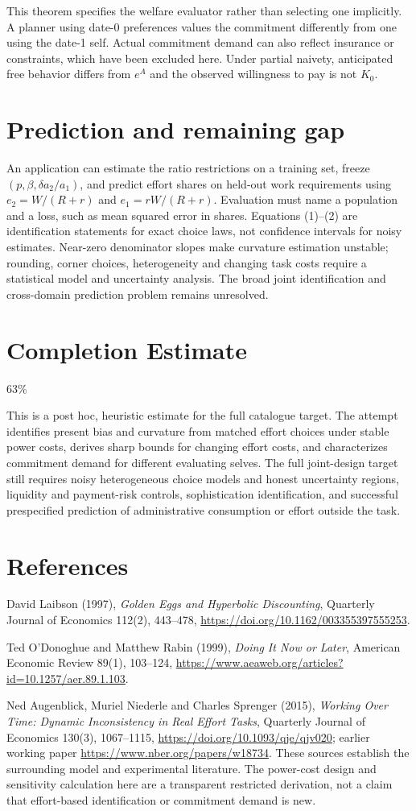 \documentclass[11pt,a4paper]{article}
\theoremstyle{definition}
\theoremstyle{remark}
\begin{document}
This theorem specifies the welfare evaluator rather than selecting one implicitly. A planner using date-0 preferences values the commitment differently from one using the date-1 self. Actual commitment demand can also reflect insurance or constraints, which have been excluded here. Under partial naivety, anticipated free behavior differs from $e^A$ and the observed willingness to pay is not $K_0$.

\section{Prediction and remaining gap}
An application can estimate the ratio restrictions on a training set, freeze $(p,\beta,\delta a_2/a_1)$, and predict effort shares on held-out work requirements using $e_2=W/(R+r)$ and $e_1=rW/(R+r)$. Evaluation must name a population and a loss, such as mean squared error in shares. Equations (1)--(2) are identification statements for exact choice laws, not confidence intervals for noisy estimates. Near-zero denominator slopes make curvature estimation unstable; rounding, corner choices, heterogeneity and changing task costs require a statistical model and uncertainty analysis. The broad joint identification and cross-domain prediction problem remains unresolved.

\section{Completion Estimate}
63\%

This is a post hoc, heuristic estimate for the full catalogue target.
The attempt identifies present bias and curvature from matched effort choices under stable power costs, derives sharp bounds for changing effort costs, and characterizes commitment demand for different evaluating selves. The full joint-design target still requires noisy heterogeneous choice models and honest uncertainty regions, liquidity and payment-risk controls, sophistication identification, and successful prespecified prediction of administrative consumption or effort outside the task.

\section{References}
David Laibson (1997), \emph{Golden Eggs and Hyperbolic Discounting}, Quarterly Journal of Economics 112(2), 443--478, \url{https://doi.org/10.1162/003355397555253}.

Ted O'Donoghue and Matthew Rabin (1999), \emph{Doing It Now or Later}, American Economic Review 89(1), 103--124, \url{https://www.aeaweb.org/articles?id=10.1257/aer.89.1.103}.

Ned Augenblick, Muriel Niederle and Charles Sprenger (2015), \emph{Working Over Time: Dynamic Inconsistency in Real Effort Tasks}, Quarterly Journal of Economics 130(3), 1067--1115, \url{https://doi.org/10.1093/qje/qjv020}; earlier working paper \url{https://www.nber.org/papers/w18734}. These sources establish the surrounding model and experimental literature. The power-cost design and sensitivity calculation here are a transparent restricted derivation, not a claim that effort-based identification or commitment demand is new.
\end{document}

